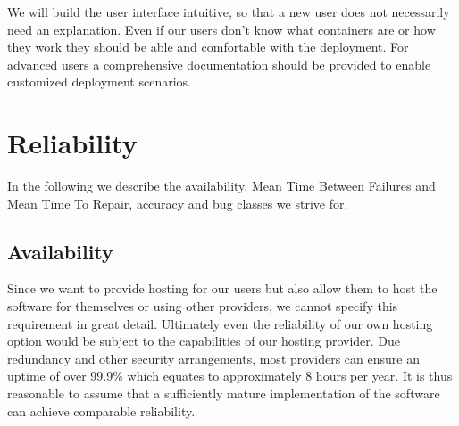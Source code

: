 \documentclass[a4paper,12pt,chapterprefix=false,bibliography=totoc,listof=totoc,]{scrreprt}
\begin{document}
{\color{magenta}
We will build the user interface intuitive, so that a new user does not necessarily need an explanation. Even if our users don't know what containers are or how they work they should be able and comfortable with the deployment. For advanced users a comprehensive documentation should be provided to enable customized deployment scenarios.
}

\section{{\color{magenta} Reliability}}
{\color{magenta}
In the following we describe the availability, Mean Time Between Failures and Mean Time To Repair, accuracy and bug classes we strive for.
}


\subsection{{\color{magenta} Availability}}
{\color{magenta}
Since we want to provide hosting for our users but also allow them to host the software for themselves or using other providers, we cannot specify this requirement in great detail. Ultimately even the reliability of our own hosting option would be subject to the capabilities of our hosting provider. Due redundancy and other security arrangements, most providers can ensure an uptime of over 99.9\% which equates to approximately 8 hours per year. It is thus reasonable to assume that a sufficiently mature implementation of the software can achieve comparable reliability.
}
\end{document}

